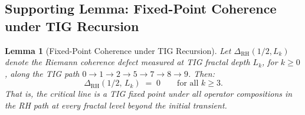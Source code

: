 \documentclass[11pt]{article}
\newtheorem{lemma}[theorem]{Lemma}
\theoremstyle{remark}
\begin{document}
\subsection{Supporting Lemma: Fixed-Point Coherence under TIG Recursion}
\label{subsec:tig-fixed-point}

\begin{lemma}[Fixed-Point Coherence under TIG Recursion]
\label{lem:tig-fixed-point}
Let $\Delta_{\mathrm{RH}}(1/2, L_k)$ denote the Riemann coherence defect
measured at TIG fractal depth $L_k$, for $k \geq 0$, along the TIG path
$0 \to 1 \to 2 \to 5 \to 7 \to 8 \to 9$.
Then:
\begin{equation}\label{eq:tig-fixed-point}
  \Delta_{\mathrm{RH}}(1/2,\, L_k) \;=\; 0
  \qquad \text{for all } k \geq 3.
\end{equation}
That is, the critical line is a TIG fixed point under all operator compositions
in the RH path at every fractal level beyond the initial transient.
\end{lemma}
\end{document}
